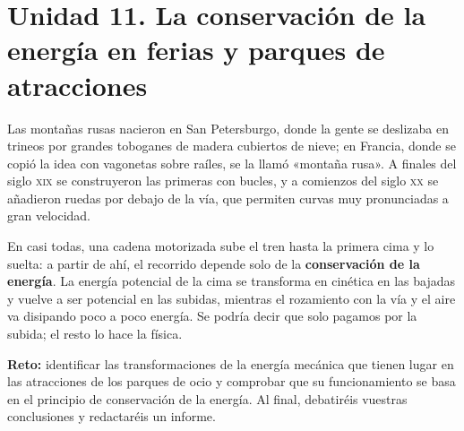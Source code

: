 \section[Unidad 11. La energía en las ferias]{Unidad 11. La conservación de la energía en ferias y parques de atracciones}

Las montañas rusas nacieron en San Petersburgo, donde la gente se deslizaba en trineos por grandes toboganes de madera cubiertos de nieve; en Francia, donde se copió la idea con vagonetas sobre raíles, se la llamó «montaña rusa». A finales del siglo \textsc{xix} se construyeron las primeras con bucles, y a comienzos del siglo \textsc{xx} se añadieron ruedas por debajo de la vía, que permiten curvas muy pronunciadas a gran velocidad.

En casi todas, una cadena motorizada sube el tren hasta la primera cima y lo suelta: a partir de ahí, el recorrido depende solo de la \textbf{conservación de la energía}. La energía potencial de la cima se transforma en cinética en las bajadas y vuelve a ser potencial en las subidas, mientras el rozamiento con la vía y el aire va disipando poco a poco energía. Se podría decir que solo pagamos por la subida; el resto lo hace la física.

\begin{marker}
    \textbf{Reto:} identificar las transformaciones de la energía mecánica que tienen lugar en las atracciones de los parques de ocio y comprobar que su funcionamiento se basa en el principio de conservación de la energía. Al final, debatiréis vuestras conclusiones y redactaréis un informe.
\end{marker}

